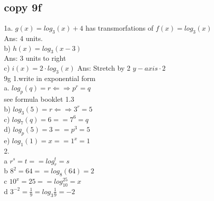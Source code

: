 \documentclass{article}
\begin{document}
  \subsection{copy 9f}
  1a. $g(x)=log_3(x)+4$ has transmorfations of $f(x)=log_3(x)$\\
  Ans: 4 units.\\
  b) $h(x)=log_3(x-3)$\\
  Ans: 3 units to right\\
  c) $i(x)=2\cdot log_3(x)$ Ans: Stretch by 2 $y-axis\cdot2$\\
  9g 
  1.write in exponential form\\
  a. $log_p(q)=r \Leftarrow\Rightarrow p^r=q$\\
  see formula booklet 1.3\\
  b) $log_3(5)=r \Leftarrow\Rightarrow 3^r=5$\\
  c) $log_7(q)=6 == 7^6=q$\\
  d) $log_p(5)=3 == p^3=5$\\
  e) $log_1(1)=x == 1^x=1$\\
  2. \\
  a $r^s=t == log_r^t=s$\\ 
  b $8^2=64 == log_8(64)=2$\\
  c $10^x=25 == log_{10}^{25}=x$\\
  d $3^{-2}=\frac{1}{9}=log_3\frac{1}{9}=-2$\\

   
\end{document}
